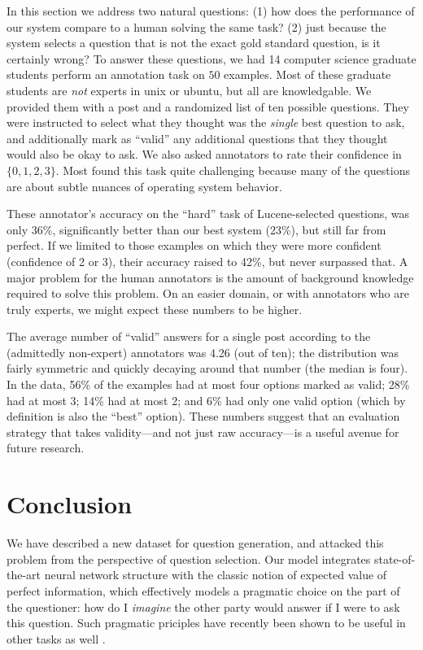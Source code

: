 \documentclass[11pt]{report}
\renewcommand\cite{\citep}	%
\begin{document}
In this section we address two natural questions:
(1) how does the performance of our system compare to a human solving the same task?
(2) just because the system selects a question that is not the exact gold standard question, is it certainly wrong?
To answer these questions, we had 14 computer science graduate students perform an annotation task on $50$ examples.
Most of these graduate students are \emph{not} experts in unix or ubuntu, but all are knowledgable.
We provided them with a post and a randomized list of ten possible questions.
They were instructed to select what they thought was the \emph{single} best question to ask, and additionally mark as ``valid'' any additional questions that they thought would also be okay to ask.
We also asked annotators to rate their confidence in $\{0,1,2,3\}$.
Most found this task quite challenging because many of the questions are about subtle nuances of operating system behavior.

These annotator's accuracy on the ``hard'' task of Lucene-selected questions, was only 36\%, significantly better than our best system (23\%), but still far from perfect.
If we limited to those examples on which they were more confident (confidence of 2 or 3), their accuracy raised to 42\%, but never surpassed that.
A major problem for the human annotators is the amount of background knowledge required to solve this problem.
On an easier domain, or with annotators who are truly experts, we might expect these numbers to be higher.

The average number of ``valid'' answers for a single post according to the (admittedly non-expert) annotators was 4.26 (out of ten); the distribution was fairly symmetric and quickly decaying around that number (the median is four).
In the data, 56\% of the examples had at most four options marked as valid; 
28\% had at most 3; 14\% had at most 2; and 6\% had only one valid option (which by definition is also the ``best'' option).
These numbers suggest that an evaluation strategy that takes validity---and not just raw accuracy---is a useful avenue for future research.

\section{Conclusion}

We have described a new dataset for question generation, and attacked this problem from the perspective of question selection.
Our model integrates state-of-the-art neural network structure with the classic notion of expected value of perfect information, which effectively models a pragmatic choice on the part of the questioner: how do I \emph{imagine} the other party would answer if I were to ask this question. Such pragmatic priciples have recently been shown to be useful in other tasks as well \cite{golland2010game,smith2013learning,orita2015discourse,andreas2016reasoning}.
\end{document}
